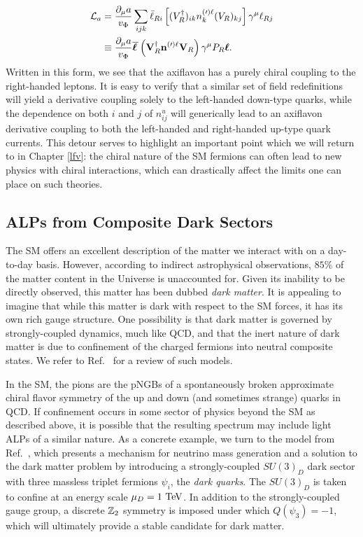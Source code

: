 {\begin{align}
    {\cal L}_{a} &= \frac{\partial_\mu a}{v_\Phi} \sum_{ijk} \bar{\ell}_{Ri}\left[(V_R^\dagger)_{ik}n_{k}^{(\prime)\ell}(V_R)_{kj}\right] \gamma^\mu\ell_{Rj}\nonumber\\
    &\equiv \frac{\partial_\mu a}{v_\Phi}\overline{\boldsymbol \ell\hspace{0.05cm}} \left({\bf V}_R^\dagger {\bf n}^{(\prime) \ell}{\bf V}_R\right)\gamma^\mu P_R{\boldsymbol \ell}.
\end{align}
Written in this form, we see that the axiflavon has a purely chiral coupling to the right-handed leptons. It is easy to verify that a similar set of field redefinitions will yield a derivative coupling solely to the left-handed down-type quarks, while the dependence on both $i$ and $j$ of $n_{ij}^u$ will generically lead to an axiflavon derivative coupling to both the left-handed and right-handed up-type quark currents. This detour serves to highlight an important point which we will return to in Chapter \ref{lfv}: the chiral nature of the SM fermions can often lead to new physics with chiral interactions, which can drastically affect the limits one can place on such theories.

\subsection{ALPs from Composite Dark Sectors}\label{sec:composite_ALP}
The SM offers an excellent description of the matter we interact with on a day-to-day basis. However, according to indirect astrophysical observations, $85\%$ of the matter content in the Universe is unaccounted for. Given its inability to be directly observed, this matter has been dubbed {\it dark matter}. It is appealing to imagine that while this matter is dark with respect to the SM forces, it has its own rich gauge structure.  One possibility is that dark matter is governed by strongly-coupled dynamics, much like QCD, and that the inert nature of dark matter is due to confinement of the charged fermions into neutral composite states. We refer to Ref.~\cite{Kribs:2016cew} for a review of such models.


In the SM, the pions are the pNGBs of a spontaneously broken approximate chiral flavor symmetry of the up and down (and sometimes strange) quarks in QCD. If confinement occurs in some sector of physics beyond the SM as described above, it is possible that the resulting spectrum may include light ALPs of a similar nature. As a concrete example, we turn to the model from Ref.~\cite{Davoudiasl:2017zws}, which presents a mechanism for neutrino mass generation and a solution to the dark matter problem by introducing a strongly-coupled $SU(3)_D$ dark sector with three massless triplet fermions $\psi_i$, the {\it dark quarks}. The $SU(3)_D$ is taken to confine at an energy scale $\mu_D = 1~{\rm TeV}$. In addition to the strongly-coupled gauge group, a discrete ${\Bbb Z}_2$ symmetry is imposed under which $Q(\psi_3) = -1$, which will ultimately provide a stable candidate for dark matter.

}
